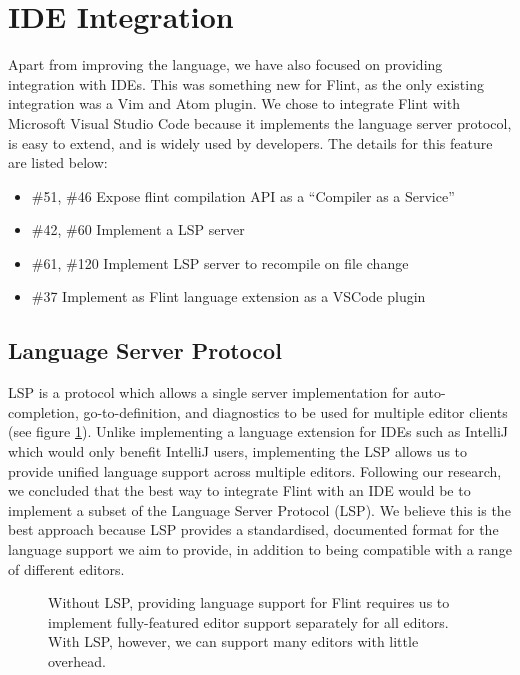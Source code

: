 \section{IDE Integration}

Apart from improving the language, we have also focused on providing integration with IDEs. This was something new for Flint, as the only existing integration was a Vim and Atom plugin. We chose to integrate Flint with Microsoft Visual Studio Code because it implements the language server protocol, is easy to extend, and is widely used by developers. The details for this feature are listed below:

\begin{itemize}
	\item \#51, \#46 Expose flint compilation API as a “Compiler as a Service”
	\item \#42, \#60 Implement a LSP server
	\item \#61, \#120 Implement LSP server to recompile on file change
	\item \#37 Implement as Flint language extension as a VSCode plugin
\end{itemize}

\subsection{Language Server Protocol}

LSP is a protocol which allows a single server implementation for auto-completion, go-to-definition, and diagnostics to be used for multiple editor clients (see figure \ref{lsp}). Unlike implementing a language extension for IDEs such as IntelliJ which would only benefit IntelliJ users, implementing the LSP allows us to provide unified language support across multiple editors. Following our research, we concluded that the best way to integrate Flint with an IDE would be to implement a subset of the Language Server Protocol (LSP). We believe this is the best approach because LSP provides a standardised, documented format for the language support we aim to provide, in addition to being compatible with a range of different editors.

\begin{figure}[htbp]
\centering
{}
\caption{Without LSP, providing language support for Flint requires us to implement fully-featured editor support separately for all editors. With LSP, however, we can support many editors with little overhead.}
\label{lsp}
\end{figure}

